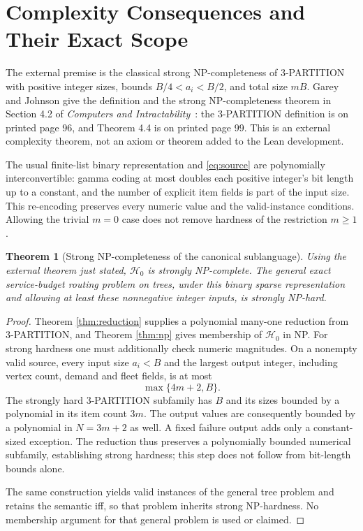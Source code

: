 \documentclass[11pt]{article}
\newtheorem{theorem}[definition]{Theorem}
\theoremstyle{remark}
\newcommand{\Hstar}{\mathcal H_0}
\begin{document}
\section{Complexity Consequences and Their Exact Scope}
\label{sec:complexity}

The external premise is the classical strong NP-completeness of
3-PARTITION with positive integer sizes, bounds $B/4<a_i<B/2$, and total
size $mB$. Garey and Johnson give the definition and the strong
NP-completeness theorem in Section 4.2 of
\emph{Computers and Intractability}~\cite{gj79}: the 3-PARTITION definition
is on printed page 96, and Theorem 4.4 is on printed page 99.
This is an external complexity theorem, not an axiom or theorem added to
the Lean development.

The usual finite-list binary representation and \eqref{eq:source} are
polynomially interconvertible: gamma coding at most doubles each positive
integer's bit length up to a constant, and the number of explicit item
fields is part of the input size. This re-encoding preserves every numeric
value and the valid-instance conditions. Allowing the trivial $m=0$ case
does not remove hardness of the restriction $m\ge1$.

\begin{theorem}[Strong NP-completeness of the canonical sublanguage]
\label{thm:strong}
Using the external theorem just stated, $\Hstar$ is strongly NP-complete.
The general exact service-budget routing problem on trees, under this
binary sparse representation and allowing at least these nonnegative
integer inputs, is strongly NP-hard.
\end{theorem}
\begin{proof}
Theorem \ref{thm:reduction} supplies a polynomial many-one reduction from
3-PARTITION, and Theorem \ref{thm:np} gives membership of $\Hstar$ in NP.
For strong hardness one must additionally check numeric magnitudes.
On a nonempty valid source, every input size $a_i<B$ and the largest output
integer, including vertex count, demand and fleet fields, is at most
\[
 \max\{4m+2,B\}.
\]
The strongly hard 3-PARTITION subfamily has $B$ and its sizes bounded by
a polynomial in its item count $3m$. The output values are consequently
bounded by a polynomial in $N=3m+2$ as well. A fixed failure output adds
only a constant-sized exception. The reduction thus preserves a
polynomially bounded numerical subfamily, establishing strong hardness;
this step does not follow from bit-length bounds alone.

The same construction yields valid instances of the general tree problem
and retains the semantic iff, so that problem inherits strong NP-hardness.
No membership argument for that general problem is used or claimed.
\end{proof}
\end{document}
